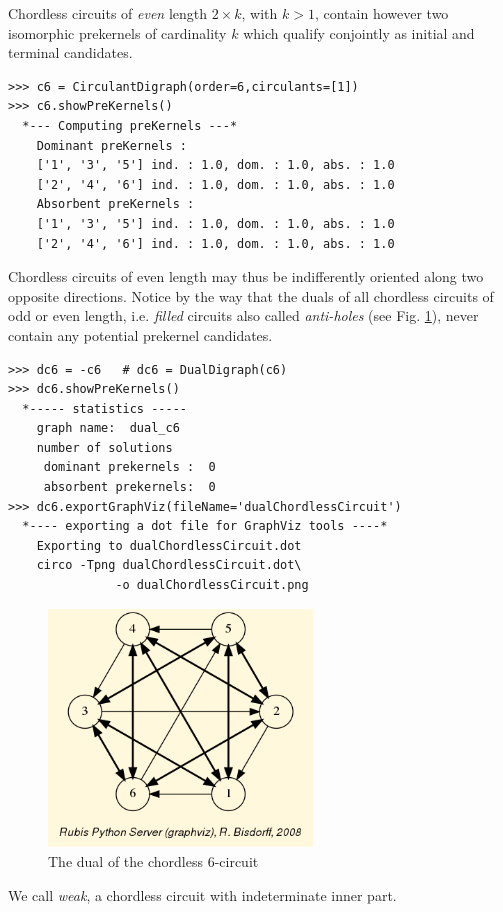 Chordless circuits of \emph{even} length $2 \times k$, with $k > 1$, contain however two isomorphic prekernels of cardinality $k$ which qualify conjointly as initial and terminal candidates.
\begin{lstlisting}
>>> c6 = CirculantDigraph(order=6,circulants=[1])
>>> c6.showPreKernels()
  *--- Computing preKernels ---*
    Dominant preKernels :
    ['1', '3', '5'] ind. : 1.0, dom. : 1.0, abs. : 1.0
    ['2', '4', '6'] ind. : 1.0, dom. : 1.0, abs. : 1.0
    Absorbent preKernels :
    ['1', '3', '5'] ind. : 1.0, dom. : 1.0, abs. : 1.0
    ['2', '4', '6'] ind. : 1.0, dom. : 1.0, abs. : 1.0
\end{lstlisting}
Chordless circuits of even length may thus be indifferently oriented along two opposite directions. Notice by the way that the duals of all chordless circuits of odd or even length, i.e. \emph{filled} circuits also called \emph{anti-holes} (see Fig. \ref{fig:17.3}), never contain any potential prekernel candidates.
\begin{lstlisting}
>>> dc6 = -c6   # dc6 = DualDigraph(c6)
>>> dc6.showPreKernels()
  *----- statistics -----
    graph name:  dual_c6
    number of solutions
     dominant prekernels :  0
     absorbent prekernels:  0
>>> dc6.exportGraphViz(fileName='dualChordlessCircuit')
  *---- exporting a dot file for GraphViz tools ----*
    Exporting to dualChordlessCircuit.dot
    circo -Tpng dualChordlessCircuit.dot\
               -o dualChordlessCircuit.png
\end{lstlisting}
\begin{figure}[h]
\sidecaption
\includegraphics[width=7cm]{Figures/dualChordlessCircuit.png}
\caption{The dual of the chordless 6-circuit}
\label{fig:17.3}       %
\end{figure}

We call \emph{weak}, a chordless circuit with indeterminate inner part.


